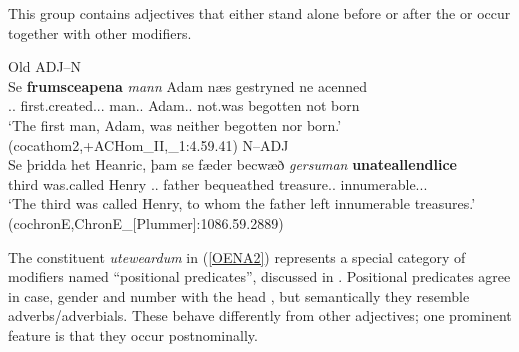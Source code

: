 \documentclass[output=paper,colorlinks,citecolor=brown,draft]{langscibook}
\begin{document}
This group contains adjectives that either stand alone before or after the  or occur together with other modifiers. 


%

\begin{exe}
\ex\label{OEAN}
Old 
\ea ADJ--N\\
\gll Se \textbf{frumsceapena} \textit{mann} Adam næs gestryned ne acenned\\
\DEF.\NOM.\SG{} first.created.\NOM.\SG.\WK{} man.\NOM.\SG{} Adam.\NOM.\SG{} not.was begotten not born\\
\glt ‘The first man, Adam, was neither begotten nor born.’ (cocathom2,+ACHom\_II,\_1:4.59.41)
\ex\label{OENA}
N--ADJ\\
\gll Se þridda het Heanric, þam se fæder becwæð \textit{gersuman} \textbf{unateallendlice}\\
	\DEF{} third was.called Henry \DEF.\DAT.\SG{} \DEF{} father bequeathed treasure.\ACC.\PL{} innumerable.\ACC.\PL.\STR{}\\
\glt‘The third was called Henry, to whom the father left innumerable treasures.' (cochronE,ChronE\_[Plummer]:1086.59.2889)
\z
\end{exe}

The constituent \textit{uteweardum} in (\ref{OENA2}) represents a special category of modifiers named “positional predicates”, discussed in . Positional predicates agree in case, gender and number with the head , but semantically they resemble adverbs/adverbials. These behave differently from other adjectives; one prominent feature is that they occur postnominally. 
\end{document}

